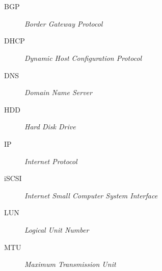 \chapter*{\nomeglosarioacronimos}
\label{chap:acronimos}


\begin{description}
 \item [BGP] \emph{Border Gateway Protocol}
 \item [DHCP] \emph{Dynamic Host Configuration Protocol}
 \item [DNS] \emph{Domain Name Server}
 \item [HDD] \emph{Hard Disk Drive}
 \item [IP] \emph{Internet Protocol}
 \item [iSCSI] \emph{Internet Small Computer System Interface}
 \item [LUN] \emph{Logical Unit Number}
 \item [MTU] \emph{Maximum Transmission Unit}

\end{description}
